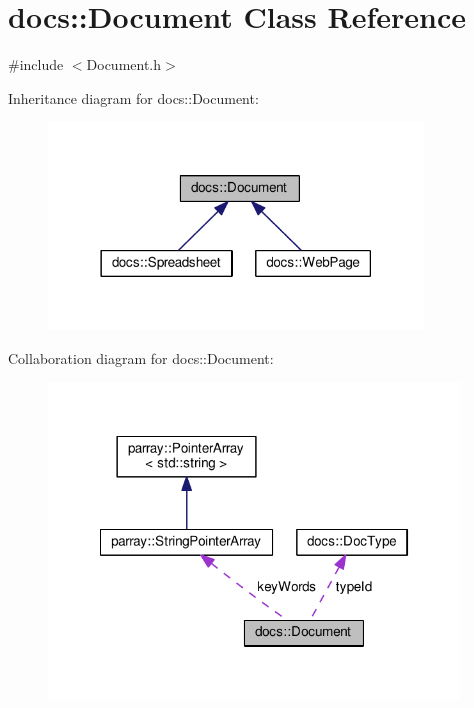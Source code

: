 \hypertarget{classdocs_1_1Document}{\section{docs\-:\-:Document Class Reference}
\label{classdocs_1_1Document}
}


{\ttfamily \#include $<$Document.\-h$>$}



Inheritance diagram for docs\-:\-:Document\-:\nopagebreak
\begin{figure}[H]
\begin{center}
\leavevmode
\includegraphics[width=282pt]{classdocs_1_1Document__inherit__graph}
\end{center}
\end{figure}


Collaboration diagram for docs\-:\-:Document\-:\nopagebreak
\begin{figure}[H]
\begin{center}
\leavevmode
\includegraphics[width=309pt]{classdocs_1_1Document__coll__graph}
\end{center}
\end{figure}
